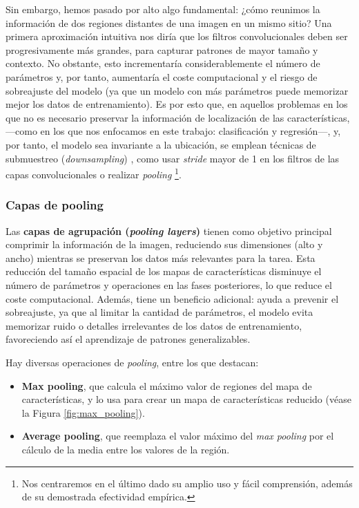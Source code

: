 Sin embargo, hemos pasado por alto algo fundamental: ¿cómo reunimos la información de dos regiones distantes 
de una imagen en un mismo sitio? Una primera aproximación intuitiva nos diría que los filtros convolucionales 
deben ser progresivamente más grandes, para capturar patrones de mayor tamaño y contexto. No obstante, esto
incrementaría considerablemente el número de parámetros y, por tanto, aumentaría el coste computacional y 
el riesgo de sobreajuste del modelo (ya que un modelo con más parámetros puede memorizar mejor los
datos de entrenamiento). Es por esto que, en aquellos problemas en los que no es necesario preservar la 
información de localización de las características, ---como en los que nos enfocamos en este trabajo: 
clasificación y regresión---, y, por tanto, el modelo sea invariante a la ubicación, se emplean técnicas de 
submuestreo (\textit{downsampling}) \cite{murphy2022}, como usar \textit{stride} mayor de 1 en los filtros
de las capas convolucionales o realizar \textit{pooling}%
\footnote{
    Nos centraremos en el último dado su amplio uso y fácil comprensión, además de su demostrada efectividad 
    empírica.
}.



\subsubsection{Capas de pooling}


Las \textbf{capas de agrupación (\textit{pooling layers})} tienen como objetivo principal comprimir la 
información de la imagen, reduciendo sus dimensiones (alto y ancho) mientras se preservan los datos más 
relevantes para la tarea. Esta reducción del tamaño espacial de los mapas de características disminuye el 
número de parámetros y operaciones en las fases posteriores, lo que reduce el coste computacional. Además, 
tiene un beneficio adicional: ayuda a prevenir el sobreajuste, ya que al limitar la cantidad de parámetros, 
el modelo evita memorizar ruido o detalles irrelevantes de los datos de entrenamiento, favoreciendo así el 
aprendizaje de patrones generalizables.

Hay diversas operaciones de \textit{pooling}, entre los que destacan:

\begin{itemize}

    \item \textbf{Max pooling}, que calcula el máximo valor de regiones del mapa de características, y lo
    usa para crear un mapa de características reducido (véase la Figura \ref{fig:max_pooling}).

    \item \textbf{Average pooling}, que reemplaza el valor máximo del \textit{max pooling} por el cálculo de
    la media entre los valores de la región. 

\end{itemize}

